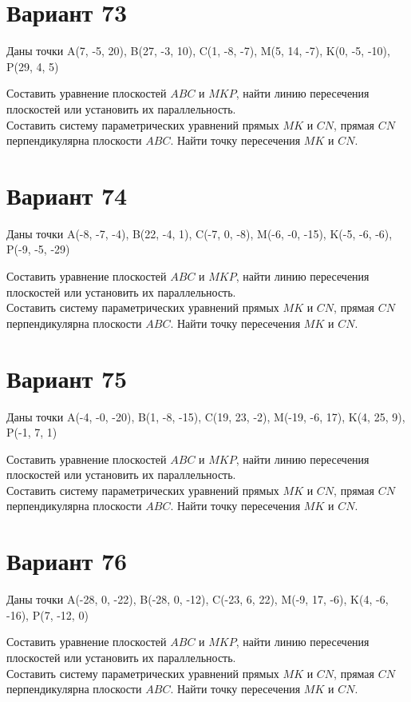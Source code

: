 \documentclass[11pt]{article}
\begin{document}
\section*{Вариант 73}
Даны точки A(7, -5, 20), B(27, -3, 10), C(1, -8, -7), M(5, 14, -7), K(0, -5, -10), P(29, 4, 5)

Составить уравнение плоскостей $ABC$ и $MKP$, найти линию пересечения плоскостей или установить их параллельность.\\
Составить систему параметрических уравнений прямых $MK$ и $CN$, прямая $CN$ перпендикулярна плоскости $ABC$. Найти точку пересечения $MK$ и $CN$.

\section*{Вариант 74}
Даны точки A(-8, -7, -4), B(22, -4, 1), C(-7, 0, -8), M(-6, -0, -15), K(-5, -6, -6), P(-9, -5, -29)

Составить уравнение плоскостей $ABC$ и $MKP$, найти линию пересечения плоскостей или установить их параллельность.\\
Составить систему параметрических уравнений прямых $MK$ и $CN$, прямая $CN$ перпендикулярна плоскости $ABC$. Найти точку пересечения $MK$ и $CN$.

\section*{Вариант 75}
Даны точки A(-4, -0, -20), B(1, -8, -15), C(19, 23, -2), M(-19, -6, 17), K(4, 25, 9), P(-1, 7, 1)

Составить уравнение плоскостей $ABC$ и $MKP$, найти линию пересечения плоскостей или установить их параллельность.\\
Составить систему параметрических уравнений прямых $MK$ и $CN$, прямая $CN$ перпендикулярна плоскости $ABC$. Найти точку пересечения $MK$ и $CN$.

\section*{Вариант 76}
Даны точки A(-28, 0, -22), B(-28, 0, -12), C(-23, 6, 22), M(-9, 17, -6), K(4, -6, -16), P(7, -12, 0)

Составить уравнение плоскостей $ABC$ и $MKP$, найти линию пересечения плоскостей или установить их параллельность.\\
Составить систему параметрических уравнений прямых $MK$ и $CN$, прямая $CN$ перпендикулярна плоскости $ABC$. Найти точку пересечения $MK$ и $CN$.
\end{document}
